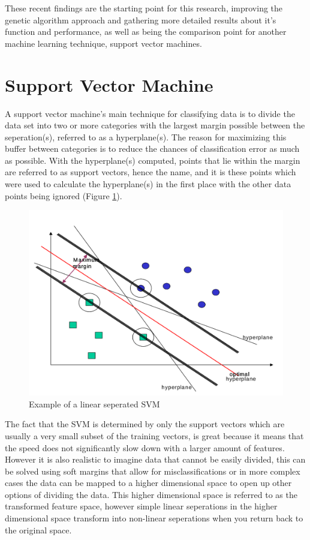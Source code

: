 These recent findings are the starting point for this research, improving the genetic algorithm approach and gathering more detailed results about it's function and performance, as well as being the comparison point for another machine learning technique, support vector machines.

\section{Support Vector Machine} \label{sec:SVM}

A support vector machine's main technique for classifying data is to divide the data set into two or more categories with the largest margin possible between the seperation(s), referred to as a hyperplane(s).  The reason for maximizing this buffer between categories is to reduce the chances of classification error as much as possible.  With the hyperplane(s) computed, points that lie within the margin are referred to as support vectors, hence the name, and it is these points which were used to calculate the hyperplane(s) in the first place with the other data points being ignored (Figure \ref{fig:svmmargin}).  

\begin{figure}
	\includegraphics[width=450px]{./assets/img/svmmargin.png}
	\caption{Example of a linear seperated SVM}
	\label{fig:svmmargin}
\end{figure}

The fact that the SVM is determined by only the support vectors which are usually a very small subset of the training vectors, is great because it means that the speed does not significantly slow down with a larger amount of features.  However it is also realistic to imagine data that cannot be easily divided, this can be solved using soft margins that allow for misclassifications or in more complex cases the data can be mapped to a higher dimensional space to open up other options of dividing the data.  This higher dimensional space is referred to as the transformed feature space, however simple linear seperations in the higher dimensional space transform into non-linear seperations when you return back to the original space.  

